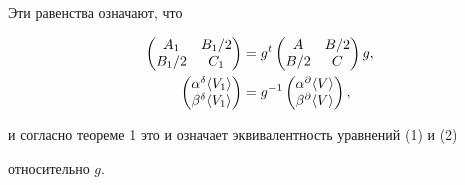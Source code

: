 Эти равенства означают, что 


\begin{align*} 


\begin{pmatrix} 


A_1 & B_1/2 \\ B_1/2 & C_1 


\end{pmatrix} 


&=g^t 


\begin{pmatrix} 


A & B/2 \\ B/2 & C


\end{pmatrix} 


g,\\ 


% 


\begin{pmatrix} 


\alpha^\delta\la V_1 \ra \\ \beta^\delta \la V_1 \ra 


\end{pmatrix} 


&=g^{-1} 


\begin{pmatrix} 


\alpha^\partial\la V \ra \\ \beta^\partial \la V \ra 


\end{pmatrix} 


, 


\end{align*} 


и согласно теореме 1 это и означает эквивалентность уравнений (1) и (2)  


относительно $g$. 


 


